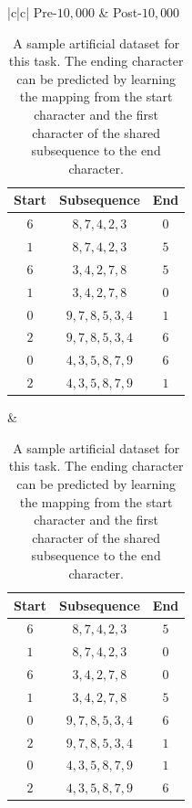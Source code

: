 \documentclass{article}
\begin{document}
\begin{table}[!h]
    \centering
    \begin{tabular}{|c|c|} \hline
        Pre-$10,000$ & Post-$10,000$  \\ \hline
        \begin{tabular}{|c|c|c|}
            Start & Subsequence & End \\ \hline
            $6$ & $8, 7, 4, 2, 3$ & $0$ \\ \hline
            $1$ & $8, 7, 4, 2, 3$ & $5$ \\ \hline
            $6$ & $3, 4, 2, 7, 8$ & $5$ \\ \hline
            $1$ & $3, 4, 2, 7, 8$ & $0$ \\ \hline
            $0$ & $9, 7, 8, 5, 3, 4$ & $1$ \\ \hline
            $2$ & $9, 7, 8, 5, 3, 4$ & $6$ \\ \hline
            $0$ & $4, 3, 5, 8, 7, 9$ & $6$ \\ \hline
            $2$ & $4, 3, 5, 8, 7, 9$ & $1$ \\ \hline
        \end{tabular} &  \begin{tabular}{|c|c|c|}
            Start & Subsequence & End \\ \hline
            $6$ & $8, 7, 4, 2, 3$ & $5$ \\ \hline
            $1$ & $8, 7, 4, 2, 3$ & $0$ \\ \hline
            $6$ & $3, 4, 2, 7, 8$ & $0$ \\ \hline
            $1$ & $3, 4, 2, 7, 8$ & $5$ \\ \hline
            $0$ & $9, 7, 8, 5, 3, 4$ & $6$ \\ \hline
            $2$ & $9, 7, 8, 5, 3, 4$ & $1$ \\ \hline
            $0$ & $4, 3, 5, 8, 7, 9$ & $1$ \\ \hline
            $2$ & $4, 3, 5, 8, 7, 9$ & $6$ \\ \hline
        \end{tabular}\\ \hline
    \end{tabular}
    \caption{A sample artificial dataset for this task. The ending character can be predicted by learning the mapping from the start character and the first character of the shared subsequence to the end character.}
    \label{tab:dataset}
\end{table}
\end{document}
